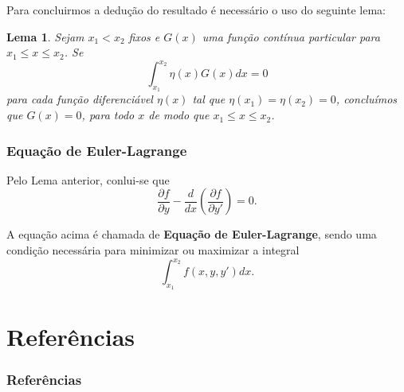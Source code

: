 \documentclass{beamer}
\newtheorem{lema}{Lema}
\begin{document}
\begin{frame}
	\justify
	Para concluirmos a dedução do resultado é necessário o uso do seguinte lema:
	
	\begin{lema}
		\justify
		Sejam $x_1 < x_2$ fixos e $G(x)$ uma função contínua particular para $x_1 \leqslant x \leqslant x_2$. Se $$\int_{x_1}^{x_2} \eta (x) G(x) dx = 0$$ para cada função diferenciável $\eta (x)$ tal que $\eta (x_1)=\eta (x_2)=0$, concluímos que $G(x)=0$, para todo $x$ de modo que $x_1 \leqslant x \leqslant x_2$.
	\end{lema}	
	
\end{frame}

\begin{frame}
	\frametitle{Equação de Euler-Lagrange}
	\justify
	
	Pelo Lema anterior, conlui-se que
	$$
		\frac{\partial f}{\partial y} - \frac{d}{dx} \left ( \frac{\partial f}{\partial y'} \right )=0 \text{.}
	$$
	\pause
	
	A equação acima é chamada de \textbf{Equação de Euler-Lagrange}, sendo uma condição necessária para minimizar ou maximizar a integral
	$$
		\int_{x_1}^{x_2} f(x, y, y')dx \text{.}
	$$
\end{frame}

\section{Referências}
\begin{frame}
	\frametitle{Referências}
	
\end{frame}
\end{document}
